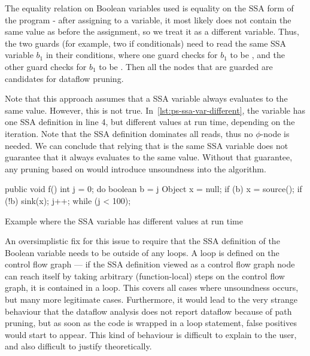 The equality relation on Boolean variables used is equality on the 
SSA form of the program - after assigning to a variable, it most likely does not
contain the same value as before the assignment, so we treat it as a different variable.
Thus, the two guards (for example, two if conditionals) need to read the same SSA 
variable $b_1$ in their conditions, where one guard checks for $b_1$ to be ,
and the other guard checks for $b_1$ to be .
Then all the nodes that are guarded are candidates for dataflow pruning.

Note that this approach assumes that a SSA variable always evaluates 
to the same value.
However, this is not true.
In~\autoref{lst:ps-ssa-var-different}, the variable  has one SSA definition 
in line 4, but different values at run time, depending on the iteration.
Note that the SSA definition dominates all reads, thus no $\phi$-node is
needed.
We can conclude that relying that  is the same SSA variable 
does not guarantee 
that it always evaluates to the same value.
Without that guarantee, any pruning based on  would introduce 
unsoundness into the algorithm.

\begin{listing}[h]
    \begin{javacode}
public void f() {
    int j = 0;
    do {
        boolean b = j %
        Object x = null;
        if (b) {
            x = source();
        }
        if (!b) {
            sink(x);
        }
        j++;
    } while (j < 100);
}
    \end{javacode}
    \caption{Example where the SSA variable  has different values at run time}
    \label{lst:ps-ssa-var-different}
\end{listing}

An oversimplistic fix for this issue to require that the SSA definition of the
Boolean variable needs to be outside of any loops.
A loop is defined on the control flow graph ---
if the SSA definition viewed as a control flow graph node can reach itself by taking
arbitrary (function-local) steps on the control flow graph, it is contained in a loop.
This covers all cases where unsoundness occurs, but many more legitimate cases.
Furthermore, it would lead to the very strange behaviour that the dataflow analysis 
does not report dataflow because of path pruning, but as soon as the code is 
wrapped in a loop statement, false positives would start to appear.
This kind of behaviour is difficult to explain to the user, and also difficult
to justify theoretically.

